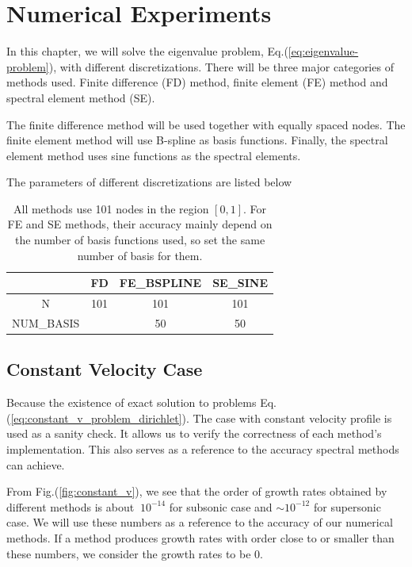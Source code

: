 \chapter{Numerical Experiments}
In this chapter, we will solve the eigenvalue problem, Eq.(\ref{eq:eigenvalue-problem}), with different discretizations. There will be three major categories of methods used. Finite difference (FD) method, finite element (FE) method and spectral element method (SE).

The finite difference method will be used together with equally spaced nodes. The finite element method will use B-spline as basis functions. Finally, the spectral element method uses sine functions as the spectral elements.

The parameters of different discretizations are listed below
\begin{table} [H]
	\centering
	\caption{All methods use 101 nodes in the region $[0,1]$. For FE and SE methods, their accuracy mainly depend on the number of basis functions used, so set the same number of basis for them.}
	\begin{tabular}{|c|c|c|c|}
		\hline
		& FD & FE\_BSPLINE & SE\_SINE  \\
		\hline
		N & 101 & 101 & 101 \\
		\hline
		NUM\_BASIS &  & 50 & 50 \\
		\hline
	\end{tabular}
	\label{table:parameters}
\end{table}

\section{Constant Velocity Case}
Because the existence of exact solution to problems Eq.(\ref{eq:constant_v_problem_dirichlet}). The case with constant velocity profile is used as a sanity check. It allows us to verify the correctness of each method's implementation. This also serves as a reference to the accuracy spectral methods can achieve.

From Fig.(\ref{fig:constant_v}), we see that the order of growth rates obtained by different methods is about $~10^{-14}$ for subsonic case and  $\sim 10^{-12}$ for supersonic case. We will use these numbers as a reference to the accuracy of our numerical methods. If a method produces growth rates with order close to or smaller than these numbers, we consider the growth rates to be 0.

